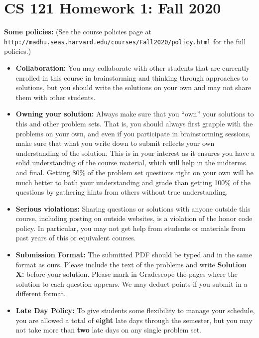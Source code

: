 \documentclass[11pt]{article}
\begin{document}
	\section*{CS 121 Homework 1: Fall
		2020}\label{cs-121-homework-zero-fall-2020}

	\textbf{Some policies:} (See the course policies page at \\ {\tt http://madhu.seas.harvard.edu/courses/Fall2020/policy.html} for the
	full policies.)

	\begin{itemize}
		\item
		{\bf Collaboration:} You may collaborate with other   students that are currently enrolled in
		this course
		in brainstorming and thinking through approaches to
		solutions, but you should write the solutions on your own and may not
		share them with other students.
		\item
		{\bf Owning your solution:} Always make sure that you ``own'' your solutions to this and other problem
		sets. That is, you should always first grapple with the problems on
		your own, and even if you participate in brainstorming sessions, make
		sure that what you write down to submit reflects your own understanding of the solution.
		This is in your interest as it ensures you have a solid
		understanding of the course material, which will help in the midterms
		and final. Getting 80\% of the problem
		set questions right on your own will be much better to both your
		understanding and grade than getting 100\% of the questions by
		gathering hints from others without true understanding.
		\item
		{\bf Serious violations:} Sharing questions or solutions with anyone outside this course,
		including posting on outside websites, is a violation of the honor
		code policy. In particular, you may not get help from students or materials from past years of 			this or equivalent courses.
		\item
		{\bf Submission Format:} The submitted PDF should be typed and in the same format as
		ours. Please include the text of the problems and write
		\textbf{Solution X:} before your solution. Please mark in Gradescope
		the pages where
		the solution to each question appears. We may deduct points if you
		submit in a different format.
		\item {\bf Late Day Policy:} To give students some flexibility to manage your schedule, you are allowed a total of {\bf eight} late days through the semester, but you may not take more than {\bf two} late days on any single problem set.
	\end{itemize}
\end{document}
